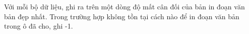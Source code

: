 Với mỗi bộ dữ liệu, ghi ra trên một dòng độ mất cân đối của bản in đoạn văn bản đẹp nhất. Trong trường hợp không tồn tại cách nào để in đoạn văn bản trong ô đã cho, ghi -1.